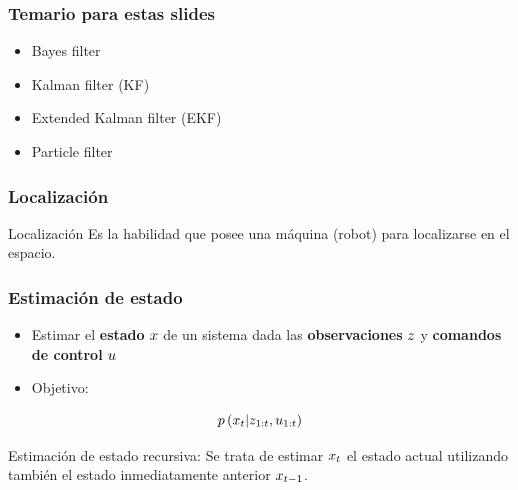 \begin{frame}
    \frametitle{Temario para estas slides}
    
    \begin{itemize}
        \item Bayes filter
        \item Kalman filter (KF)
        \item Extended Kalman filter (EKF)
        \item Particle filter
    \end{itemize}
    
\end{frame}

\begin{frame}
  \frametitle{Localización}
    \begin{block}{Localización}
        Es la habilidad que posee una máquina (robot) para localizarse en el espacio.
    \end{block}
\end{frame}


\begin{frame}
    \frametitle{Estimación de estado}
    
    
    \begin{itemize}
        \item  Estimar el \textbf{estado} $x$ de un sistema dada las \textbf{observaciones} $z$ y \textbf{comandos de control} $u$
        \item Objetivo:
    \end{itemize}
    
    \begin{equation}
        p\left(x_{t} | z_{1:t}, u_{1:t} \right)
    \end{equation}
    
    Estimación de estado recursiva: Se trata de estimar $x_{t}$ el estado actual utilizando también el estado inmediatamente anterior $x_{t-1}$.
\end{frame}

